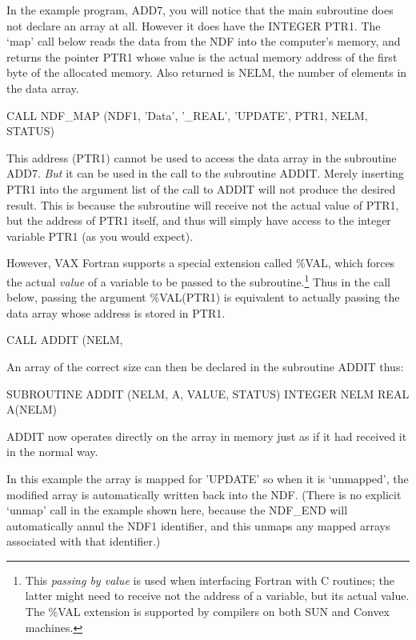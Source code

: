 \documentclass[twoside,11pt,nolof]{starlink}
\begin{document}
In the example program, ADD7, you will notice that the main subroutine does not
declare an array at all.
However it does have the INTEGER PTR1.
The `map' call below reads the data from the NDF into the computer's
memory, and
returns the pointer PTR1 whose value  is the actual memory address of
the first byte of the allocated memory.
Also returned is NELM, the number of elements in the data array.
\begin{terminalv}
      CALL NDF_MAP (NDF1, 'Data', '_REAL', 'UPDATE', PTR1, NELM, STATUS)
\end{terminalv}
This address (PTR1) cannot be used to access  the data array in the subroutine
ADD7.
{\sl But\/} it can be used in the call to the subroutine ADDIT.
Merely inserting PTR1 into the argument list of the call to
ADDIT will not produce the desired result.
This is  because the subroutine will receive not
the actual value of PTR1,
but the address of PTR1 itself, and thus will simply have access to
the integer variable PTR1  (as you would expect).

However, VAX Fortran supports a special extension called \%VAL, which forces
the actual  {\sl value\/}
of a variable to be passed to the
subroutine.\footnote{This {\sl passing by value\/} is used when interfacing
Fortran
with C routines; the latter might need to receive not the address of a
variable, but its actual value.
The \%VAL extension is supported by compilers on both SUN and Convex machines.}
Thus in  the call below, passing the argument \%VAL(PTR1) is equivalent
to actually passing the data array whose address is stored in PTR1.
\begin{terminalv}
         CALL ADDIT (NELM, %
\end{terminalv}
An array of the correct size  can then be declared in the subroutine ADDIT
thus:
\begin{terminalv}
      SUBROUTINE ADDIT (NELM, A, VALUE, STATUS)
      INTEGER NELM
      REAL A(NELM)
\end{terminalv}
ADDIT now operates directly on the array in memory just as if it had
received it in the normal way.

In this example the array is mapped for 'UPDATE' so when it is
`unmapped', the modified array is automatically written back into the NDF.
(There is no explicit `unmap' call in the example shown here,
because the NDF\_END will automatically
annul the NDF1 identifier, and this
unmaps any mapped arrays associated with that identifier.)
\end{document}
